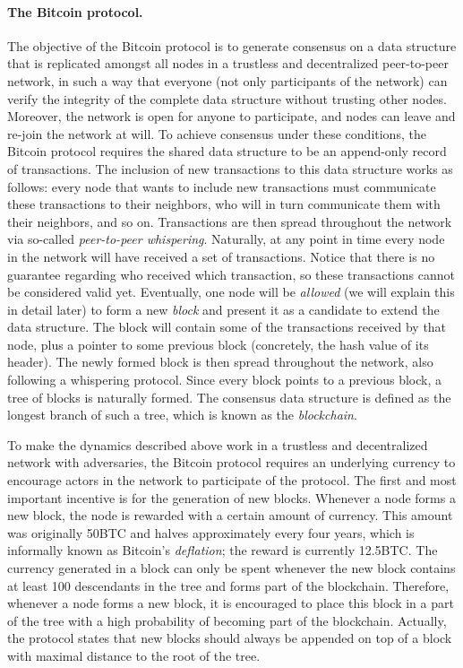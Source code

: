 \paragraph{\bf The Bitcoin protocol.} The objective of the Bitcoin protocol is to generate consensus on a data structure that is replicated amongst all nodes in a trustless 
and decentralized peer-to-peer network, in such a way that everyone (not only participants of the network) can verify the integrity of the complete data structure without trusting other nodes. Moreover, the network is open for anyone to participate, and nodes can leave and re-join the network at will. To achieve consensus under these conditions, the Bitcoin protocol requires the shared data structure to be an append-only record of transactions. The inclusion of new transactions to this data structure works as follows: every node that wants to include new transactions must communicate these transactions to their neighbors, who will in turn communicate them with their neighbors, and so on. Transactions are then spread throughout the network via so-called \emph{peer-to-peer whispering}. Naturally, at any point in time every node in the network will have received a set of transactions. Notice that there is no guarantee regarding who received which transaction, so these transactions cannot be considered valid yet. Eventually, one node will be \emph{allowed} (we will explain this in detail later) to form a new \emph{block} and present it as a candidate to extend the data structure. The block will contain some of the transactions received by that node, plus a pointer to some previous block (concretely, the hash value of its header). The newly formed block is then spread throughout the network, also following a whispering protocol. Since every block points to a previous block, a tree of blocks is naturally formed. The consensus data structure is defined as the longest branch of such a tree, which is known as the \emph{blockchain}.

To make the dynamics described above work in a trustless and decentralized network with adversaries, the Bitcoin protocol requires an underlying currency to encourage actors in the network to participate of the protocol. The first and most important incentive is for the generation of new blocks. Whenever a node forms a new block, the node is rewarded with a certain amount of currency. This amount was originally 50BTC and halves  approximately every four years, which is informally known as Bitcoin's \emph{deflation}; the reward is currently 12.5BTC. The currency generated in a block can only be spent whenever the new block contains at least 100 descendants in the tree and forms part of the blockchain. Therefore, whenever a node forms a new block, it is encouraged to place this block in a part of the tree with a high probability of becoming part of the blockchain. Actually, the protocol states that new blocks should always be appended on top of a block with maximal distance to the root of the tree.

